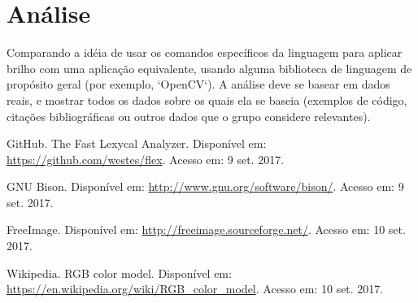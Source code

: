\documentclass[a4paper, 10pt, conference]{ieeeconf}
\begin{document}
\section{Análise}

Comparando a idéia de usar os comandos específicos da linguagem para aplicar brilho com uma aplicação equivalente, usando alguma biblioteca de linguagem de propósito geral (por exemplo, `OpenCV`). A análise deve se basear em dados reais, e mostrar todos os dados sobre os quais ela se baseia (exemplos de código, citações bibliográficas ou outros dados que o grupo considere relevantes).

\begin{thebibliography}{99}

 GitHub. The Fast Lexycal Analyzer. Disponível em: \url{https://github.com/westes/flex}. Acesso em: 9 set. 2017. 

 GNU Bison. Disponível em: \url{http://www.gnu.org/software/bison/}. Acesso em: 9 set. 2017.

 FreeImage. Disponível em: \url{http://freeimage.sourceforge.net/}. Acesso em: 10 set. 2017.

 Wikipedia. RGB color model. Disponível em: \url{https://en.wikipedia.org/wiki/RGB_color_model}. Acesso em: 10 set. 2017.

\end{thebibliography}
\end{document}
